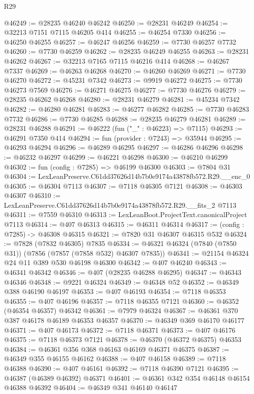 \begin{lexlean}{R29}
\begin{coremodule}
@46249 := @28235 @46240 @46242
@46250 := @28231 @46249
@46254 := @32213 @7151 @7115 @46205 @414
@46255 := @46254 @7330
@46256 := @46250 @46255
@46257 := @46247 @46256
@46259 := @7730 @46257 @7732
@46260 := @7730 @46259
@46262 := @28235 @46249 @46255
@46263 := @28231 @46262
@46267 := @32213 @7165 @7115 @46216 @414
@46268 := @46267 @7337
@46269 := @46263 @46268
@46270 := @46260 @46269
@46271 := @7730 @46270
@46272 := @45231 @7342
@46273 := @9919 @46272
@46275 := @7730 @46273 @7569
@46276 := @46271 @46275
@46277 := @7730 @46276
@46279 := @28235 @46262 @46268
@46280 := @28231 @46279
@46281 := @45234 @7342
@46282 := @46280 @46281
@46283 := @46277 @46282
@46285 := @7730 @46283 @7732
@46286 := @7730 @46285
@46288 := @28235 @46279 @46281
@46289 := @28231 @46288
@46291 := @46222 (fun ("_" : @46223) => @7115)
@46293 := @46291 @7350 @414
@46294 := fun (provider : @7243) => @35944
@46295 := @46293 @46294
@46296 := @46289 @46295
@46297 := @46286 @46296
@46298 := @46232 @46297
@46299 := @46221 @46298
@46300 := @46210 @46299
@46302 := fun (config : @7285) => @46199 @46300
@46303 := @7804 @31
@46304 := LexLeanPreserve.C61dd37626d14b7b0e9174a43878fb572.R29.__enc_0
@46305 := @46304 @7113
@46307 := @7118 @46305 @7121
@46308 := @46303 @46307
@46310 := LexLeanPreserve.C61dd37626d14b7b0e9174a43878fb572.R29.__fits_2 @7113
@46311 := @7559 @46310
@46313 := LexLeanBoot.ProjectText.canonicalProject @7113
@46314 := @407 @46313
@46315 := @46311 @46314
@46317 := (config : @7285) -> @46308 @46315
@46321 := @7820 @31 @46307 @46315 @532
@46324 := @7828 (@7832 @46305) @7835
@46334 := @46321 @46324 (@7840 (@7850 @31)) (@7856 (@7857 (@7858 @532) @46307 @7835))
@46341 := @21154 @46324 @24 @11 @389 @530 @46198 @46300
@46342 := @407 @46240
@46343 := @46341 @46342
@46346 := @407 (@28235 @46288 @46295)
@46347 := @46343 @46346
@46348 := @9221 @46324
@46349 := @46348 @52
@46352 := @46349 @388 @46190 @46197
@46353 := @407 @46193
@46354 := @7118 @46353
@46355 := @407 @46196
@46357 := @7118 @46355 @7121
@46360 := @46352 (@46354 @46357) @46342
@46361 := @7979 @46324
@46367 := @46361 @370 @387 @46178 @46189 @46353 @46357
@46370 := @46349 @369 @46170 @46177
@46371 := @407 @46173
@46372 := @7118 @46371
@46373 := @407 @46176
@46375 := @7118 @46373 @7121
@46378 := @46370 (@46372 @46375) @46353
@46384 := @46361 @356 @368 @46163 @46169 @46371 @46375
@46387 := @46349 @355 @46155 @46162
@46388 := @407 @46158
@46389 := @7118 @46388
@46390 := @407 @46161
@46392 := @7118 @46390 @7121
@46395 := @46387 (@46389 @46392) @46371
@46401 := @46361 @342 @354 @46148 @46154 @46388 @46392
@46404 := @46349 @341 @46140 @46147

\end{coremodule}
\end{lexlean}

